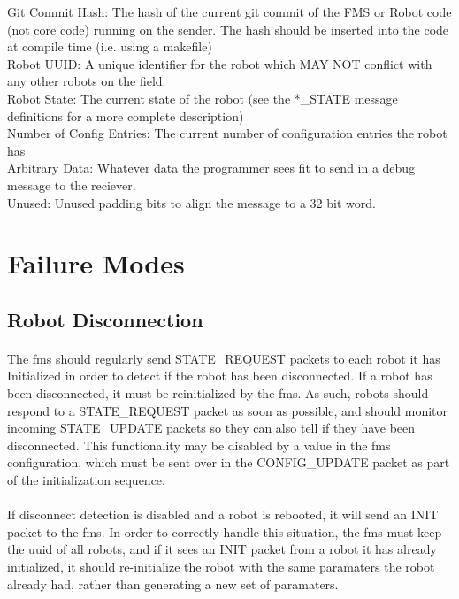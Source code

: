 \documentclass[11pt]{article}
\begin{document}
Git Commit Hash: The hash of the current git commit of the FMS or Robot code (not core code) running on the sender.
The hash should be inserted into the code at compile time (i.e. using a makefile)\\
Robot UUID: A unique identifier for the robot which MAY NOT conflict with any other robots on the field.\\
Robot State: The current state of the robot (see the *\_STATE message definitions for a more complete description)\\
Number of Config Entries: The current number of configuration entries the robot has\\
Arbitrary Data: Whatever data the programmer sees fit to send in a debug message to the reciever.\\
Unused:  Unused padding bits to align the message to a 32 bit word.\\

\clearpage

\section{Failure Modes}
\subsection{Robot Disconnection}
\paragraph{}
The \acrshort{fms} should regularly send STATE\_REQUEST packets to each robot it has Initialized 
in order to detect if the robot has been disconnected.  If a robot has been disconnected, 
it must be reinitialized by the \acrshort{fms}.
As such, robots should respond to a STATE\_REQUEST packet as soon as possible, and should monitor incoming STATE\_UPDATE packets
so they can also tell if they have been disconnected.  This functionality may be disabled by a value in the \acrshort{fms}
configuration, which must be sent over in the CONFIG\_UPDATE packet as part of the initialization sequence.

\paragraph{}
If disconnect detection is disabled and a robot is rebooted, it will send an INIT packet to the \acrshort{fms}.
In order to correctly handle this situation, the \acrshort{fms} must keep the \acrshort{uuid} of all robots, 
and if it sees an INIT packet from a robot it has already initialized, 
it should re-initialize the robot with the same paramaters the robot already had, rather
than generating a new set of paramaters.
\end{document}
